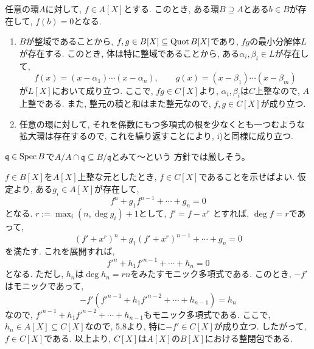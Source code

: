 \documentclass[dvipdfmx]{jsarticle}
\begin{document}
    \begin{lemma}
        任意の環$A$に対して, $f \in A[X]$とする.
        このとき, ある環$B \supseteq A$とある$b \in B$が存在して, $f(b) = 0$となる.
    \end{lemma}

    \begin{problem}
        \begin{enumerate}
            \item $B$が整域であることから, $f,g \in B[X] \subseteq \operatorname{Quot}{B}[X]$であり,
            $fg$の最小分解体$L$が存在する.
            このとき, 体は特に整域であることから, ある$\alpha_i, \beta_i \in L$が存在して,
            \[
                f(x) = (x-\alpha_1)\cdots (x-\alpha_n), \quad \quad g(x) = (x-\beta_1)\cdots (x-\beta_m)
            \]
            が$L[X]$において成り立つ.
            ここで, $fg \in C[X]$より, $\alpha_i, \beta_i$は$C$上整なので, $A$上整である.
            また, 整元の積と和はまた整元なので, $f, g \in C[X]$が成り立つ.
            \item 任意の環に対して, それを係数にもつ多項式の根を少なくとも一つむような拡大環は存在するので,
            これを繰り返すことにより, i)と同様に成り立つ.
        \end{enumerate}
    \end{problem}

    \begin{note}
        $\mathfrak{q} \in \operatorname{Spec}{B}$で$A/A\cap\mathfrak{q} \subseteq B/\mathfrak{q}$とみて～という
        方針では厳しそう。
    \end{note}

    \begin{problem}
        $f \in B[X]$を$A[X]$上整な元としたとき, $f \in C[X]$であることを示せばよい.
        仮定より, ある$g_i \in A[X]$が存在して,
        \[
            f^n + g_1 f^{n-1} + \cdots + g_n = 0
        \]
        となる.
        $r := \max_i(n, \deg{g_i}) + 1$として, $f' = f - x^r$
        とすれば, $\deg{f} = r$であって,
        \[
            (f' + x^r)^n + g_1 (f' + x^r)^{n-1} + \cdots + g_n = 0
        \]
        を満たす.
        これを展開すれば,
        \[
            f'^n + h_1f'^{n-1} + \cdots + h_n = 0
        \]
        となる.
        ただし, $h_n$は$\deg{h_n} = rn$をみたすモニック多項式である.
        このとき, $-f'$はモニックであって,
        \[
            -f'(f'^{n-1} + h_1f'^{n-2} + \cdots + h_{n-1}) = h_n
        \]
        なので, $f'^{n-1} + h_1f'^{n-2} + \cdots + h_{n-1}$もモニック多項式である.
        ここで, $h_n \in A[X] \subseteq C[X]$なので, 5.8より,
        特に$-f' \in C[X]$が成り立つ.
        したがって, $f \in C[X]$である.
        以上より, $C[X]$は$A[X]$の$B[X]$における整閉包である.
    \end{problem}
\end{document}
